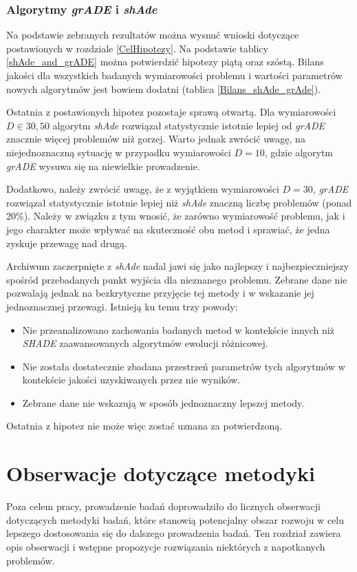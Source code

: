 \documentclass[12pt,a4paper]{report}
\begin{document}
{{{{{{{\subsection{Algorytmy \emph{grADE} i \emph{shAde}}
\par{
Na podstawie zebranych rezultatów można wysnuć wnioski dotyczące postawionych w rozdziale \ref{CelHipotezy}. Na podstawie tablicy \ref{shAde_and_grADE} można potwierdzić hipotezy piątą oraz szóstą. Bilans jakości dla wszystkich badanych wymiarowości problemu i wartości parametrów nowych algorytmów jest bowiem dodatni (tablica \ref{Bilans_shAde_grAde}).
}
\par{
Ostatnia z postawionych hipotez pozostaje sprawą otwartą. Dla wymiarowości $D \in {30, 50}$ algorytm \emph{shAde} rozwiązał statystycznie istotnie lepiej od \emph{grADE} znacznie więcej problemów niż gorzej. Warto jednak zwrócić uwagę, na niejednoznaczną sytuację w przypadku wymiarowości $D = 10$, gdzie algorytm \emph{grADE} wysuwa się na niewielkie prowadzenie.
}
\par{
Dodatkowo, należy zwrócić uwagę, że z wyjątkiem wymiarowości $D = 30$, \emph{grADE} rozwiązał statystycznie istotnie lepiej niż \emph{shAde} znaczną liczbę problemów (ponad 20\%). Należy w związku z tym wnosić, że zarówno wymiarowość problemu, jak i jego charakter może wpływać na skuteczność obu metod i sprawiać, że jedna zyskuje przewagę nad drugą.
}
\par{
Archiwum zaczerpnięte z \emph{shAde} nadal jawi się jako najlepszy i najbezpieczniejszy spośród przebadanych punkt wyjścia dla nieznanego problemu. Zebrane dane nie pozwalają jednak na bezkrytyczne przyjęcie tej metody i w wskazanie jej jednoznacznej przewagi. Istnieją ku temu trzy powody:
\begin{itemize}
\item Nie przeanalizowano zachowania badanych metod w kontekście innych niż \emph{SHADE} zaawansowanych algorytmów ewolucji różnicowej.
\item Nie została dostatecznie zbadana przestrzeń parametrów tych algorytmów w kontekście jakości uzyskiwanych przez nie wyników.
\item Zebrane dane nie wskazują w sposób jednoznaczny lepszej metody.
\end{itemize}
}
\par{
Ostatnia z hipotez nie może więc zostać uznana za potwierdzoną.
}


\chapter{Obserwacje dotyczące metodyki}
\label{metodyka}
\par{
Poza celem pracy, prowadzenie badań doprowadziło do licznych obserwacji dotyczących metodyki badań, które stanowią potencjalny obszar rozwoju w celu lepszego dostosowania się do dalszego prowadzenia badań. Ten rozdział zawiera opis obserwacji i wstępne propozycje rozwiązania niektórych z napotkanych problemów.
}
}}}}}}}
\end{document}
